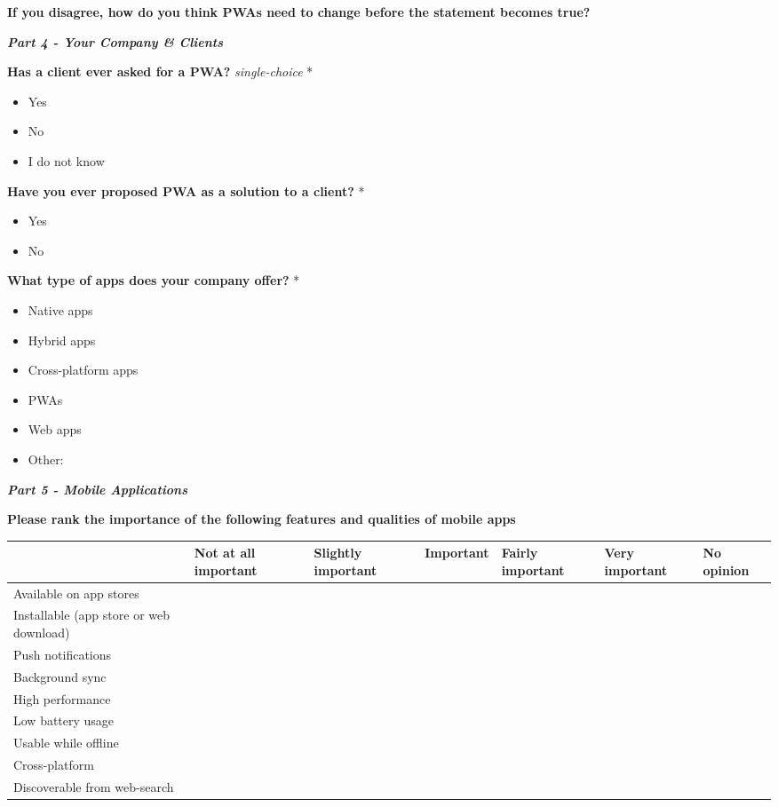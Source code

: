 \documentclass[a4paper,12pt]{article}
\begin{document}
\quad

\quad

\textbf{If you disagree, how do you think PWAs need to change before the statement becomes true?}

\quad

\quad

\textbf{\textit{Part 4 - Your Company \& Clients}}

\textbf{Has a client ever asked for a PWA?} \textit{single-choice} *
\begin{itemize}
    \item Yes
    \item No
    \item I do not know
\end{itemize}

\textbf{Have you ever proposed PWA as a solution to a client?} *
\begin{itemize}
    \item Yes
    \item No
\end{itemize}

\textbf{What type of apps does your company offer?} *
\begin{itemize}
    \item Native apps
    \item Hybrid apps
    \item Cross-platform apps
    \item PWAs
    \item Web apps
    \item Other:
\end{itemize}
\quad

\textbf{\textit{Part 5 - Mobile Applications}}

\textbf{Please rank the importance of the following features and qualities of mobile apps}
\begin{tabular}{|p{3cm}|p{1.7cm}|p{1.7cm}|p{1.6cm}|p{1.7cm}|p{1.6cm}|p{1.4cm}|}
  \hline
     & Not at all important  & Slightly important  &  Important & Fairly important  & Very important  & No opinion \\
  \hline
  Available on app stores   &   &   &   &   &   &  \\
  \hline
  Installable (app store or web download)   &   &   &   &   &   & \\
  \hline
   Push notifications  &   &   &   &   &   & \\
  \hline
   Background sync   &   &   &   &   &   & \\
  \hline
   High performance  &   &   &   &   &   & \\
  \hline
   Low battery usage  &   &   &   &   &   & \\
  \hline
   Usable while offline &   &   &   &   &   & \\
  \hline
   Cross-platform  &   &   &   &   &   & \\
  \hline
   Discoverable from web-search  &   &   &   &   &   & \\
  \hline
\end{tabular}
\end{document}
